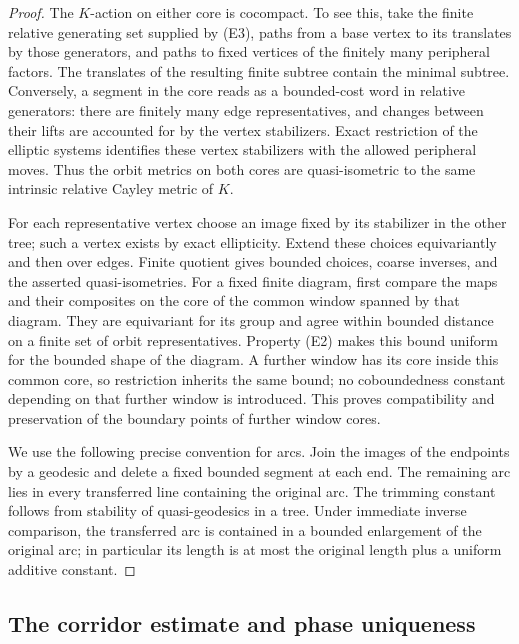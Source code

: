 \begin{proof}
The $K$-action on either core is cocompact.  To see this, take the finite
relative generating set supplied by (E3), paths from a base vertex to its
translates by those generators, and paths to fixed vertices of the finitely
many peripheral factors.  The translates of the resulting finite subtree
contain the minimal subtree.  Conversely, a segment in the core reads as a
bounded-cost word in relative generators: there are finitely many edge
representatives, and changes between their lifts are accounted for by the
vertex stabilizers.  Exact restriction of the elliptic systems identifies
these vertex stabilizers with the allowed peripheral moves.  Thus the orbit
metrics on both cores are quasi-isometric to the same intrinsic relative
Cayley metric of $K$.

For each representative vertex choose an image fixed by its stabilizer in
the other tree; such a vertex exists by exact ellipticity.  Extend these
choices equivariantly and then over edges.  Finite quotient gives bounded
choices, coarse inverses, and the asserted quasi-isometries.  For a fixed
finite diagram, first compare the maps and their composites on the core
of the common window spanned by that diagram.  They are equivariant for
its group and agree within bounded distance on a finite set of orbit
representatives.  Property (E2) makes this bound uniform for the bounded
shape of the diagram.  A further window has its core inside this common
core, so restriction inherits the same bound; no coboundedness constant
depending on that further window is introduced.  This proves compatibility
and preservation of the boundary points of further window cores.

We use the following precise convention for arcs.  Join the images of the
endpoints by a geodesic and delete a fixed bounded segment at each end.
The remaining arc lies in every transferred line containing the original
arc.  The trimming constant follows from stability of quasi-geodesics in a
tree.  Under immediate inverse comparison, the transferred arc is contained
in a bounded enlargement of the original arc; in particular its length is
at most the original length plus a uniform additive constant.
\end{proof}

\subsection{The corridor estimate and phase uniqueness}

